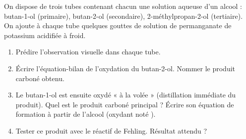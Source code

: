 \documentclass[11pt]{article}
\begin{document}
\begin{exercice}
On dispose de trois tubes contenant chacun une solution aqueuse d'un alcool : butan-1-ol (primaire), butan-2-ol (secondaire), 2-méthylpropan-2-ol (tertiaire). On ajoute à chaque tube quelques gouttes de solution de permanganate de potassium acidifiée  à froid.
\begin{enumerate}
    \item Prédire l'observation visuelle dans chaque tube.
    \item Écrire l'équation-bilan de l'oxydation du butan-2-ol. Nommer le produit carboné obtenu.
    \item Le butan-1-ol est ensuite oxydé « à la volée » (distillation immédiate du produit). Quel est le produit carboné principal ? Écrire son équation de formation à partir de l'alcool (oxydant noté \ce{[O]}).
    \item Tester ce produit avec le réactif de Fehling. Résultat attendu ?
\end{enumerate}
\end{exercice}
\end{document}
